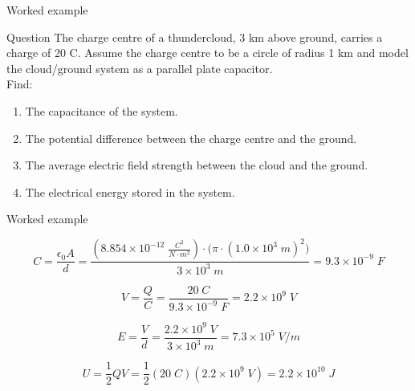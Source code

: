 {
\problemslide

%
%
%

\begin{frame}{Worked example}

\begin{blockexmplque}{Question}
The charge centre of a thundercloud, 3 km above ground, carries a charge of 20 C.
Assume the charge centre to be a circle of radius 1 km and model the cloud/ground
system as a parallel plate capacitor. \\
Find:
\begin{enumerate}
   \item The capacitance of the system.
   \item The potential difference between the charge centre and the ground.
   \item The average electric field strength between the cloud and the ground.
   \item The electrical energy stored in the system.
\end{enumerate}
\end{blockexmplque}

\end{frame}

%
%
%

\begin{frame}{Worked example}


\begin{equation*}
   C = \frac{\epsilon_0 A}{d}
      = \frac{(8.854 \times 10^{-12} \; \frac{C^2}{N \cdot m^2}) \cdot \Big( \pi \cdot (1.0 \times 10^3 \; m)^2 \Big)}{3 \times 10^3 \; m}
      = 9.3 \times 10^{-9} \; F
\end{equation*}

\begin{equation*}
   V = \frac{Q}{C}
      = \frac{20 \; C}{9.3 \times 10^{-9} \; F} = 2.2 \times 10^{9} \; V
\end{equation*}

\begin{equation*}
   E = \frac{V}{d}
      = \frac{2.2 \times 10^{9} \; V}{3 \times 10^3 \; m} = 7.3 \times 10^{5} \; V/m
\end{equation*}

\begin{equation*}
   U = \frac{1}{2} Q V
      = \frac{1}{2} (20\; C) (2.2 \times 10^{9} \; V) = 2.2 \times 10^{10} \; J
\end{equation*}

\end{frame}


} %

